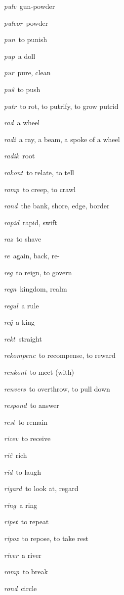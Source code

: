 \begin{landscape}
\begin{multicols}{5}
\begin{outdent}{1em}
\emph{pulv\,} gun-powder

\emph{pulvor\,} powder

\emph{pun\,} to punish

\emph{pup\,} a doll

\emph{pur\,} pure, clean

\emph{puŝ\,} to push

\emph{putr\,} to rot, to putrify, to grow putrid
\end{outdent}


\begin{outdent}{1em}
\emph{rad\,} a wheel

\emph{radi\,} a ray, a beam, a spoke of a wheel

\emph{radik\,} root

\emph{rakont\,} to relate, to tell

\emph{ramp\,} to creep, to crawl

\emph{rand\,} the bank, shore, edge, border

\emph{rapid\,} rapid, swift

\emph{raz\,} to shave

\emph{re\,} again, back, re-

\emph{reg\,} to reign, to govern

\emph{regn\,} kingdom, realm

\emph{regul\,} a rule

\emph{reĝ\,} a king

\emph{rekt\,} straight

\emph{rekompenc\,} to recompense, to reward

\emph{renkont\,} to meet (with)

\emph{renvers\,} to overthrow, to pull down

\emph{respond\,} to answer

\emph{rest\,} to remain

\emph{ricev\,} to receive

\emph{riĉ\,} rich

\emph{rid\,} to laugh

\emph{rigard\,} to look at, regard

\emph{ring\,} a ring

\emph{ripet\,} to repeat

\emph{ripoz\,} to repose, to take rest

\emph{river\,} a river

\emph{romp\,} to break

\emph{rond\,} circle


\end{outdent}
\end{multicols}
\end{landscape}
